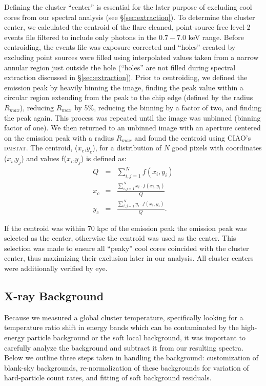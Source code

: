 \documentclass[12pt,preprint]{aastex}
\begin{document}
Defining the cluster ``center'' is essential for the later purpose of
excluding cool cores from our spectral analysis (see
\S\ref{sec:extraction}). To determine the cluster center, we
calculated the centroid of the flare cleaned, point-source
free level-2 events file filtered to include only photons in the
$0.7-7.0$ keV range. Before centroiding, the events file was
exposure-corrected and ``holes'' created by excluding point sources
were filled using interpolated values taken from a narrow annular region just
outside the hole (``holes'' are not filled during spectral extraction
discussed in \S\ref{sec:extraction}). Prior to centroiding, we defined
the emission peak by heavily binning the image, finding the peak value
within a circular region extending from the peak to the chip edge
(defined by the radius $R_{max}$), reducing $R_{max}$ by 5\%,
reducing the binning by a factor of two, and finding the peak
again. This process was repeated until the image was unbinned (binning
factor of one). We then returned to an unbinned image with an aperture
centered on the emission peak with a radius $R_{max}$ and found the
centroid using {\textsc{CIAO}}'s {\textsc{dmstat}}. The centroid, ($x_c$,$y_c$),
for a distribution of $N$ good pixels with coordinates ($x_i$,$y_j$)
and values f($x_i$,$y_j$) is defined as:
\begin{eqnarray}
Q &=& \sum_{i,j=1}^N f(x_i,y_i) \\
x_c &=& \frac{\sum_{i,j=1}^N x_i \cdot f(x_i,y_i)}{Q} \nonumber \\
y_c &=& \frac{\sum_{i,j=1}^N y_i \cdot f(x_i,y_i)}{Q}. \nonumber
\end{eqnarray}

If the centroid was within 70 kpc of the emission peak the emission
peak was selected as the center, otherwise the centroid was used
as the center. This selection was made to ensure all ``peaky'' cool
cores coincided with the cluster center, thus maximizing their
exclusion later in our analysis. All cluster centers were additionally
verified by eye.

\subsection{X-ray Background} \label{sec:background}

Because we measured a global cluster temperature, specifically looking
for a temperature ratio shift in energy bands which can be
contaminated by the high-energy particle background or the soft local
background, it was important to carefully analyze the background and
subtract it from our resulting spectra. Below we outline three steps
taken in handling the background: customization of blank-sky backgrounds,
re-normalization of these backgrounds for variation of hard-particle
count rates, and fitting of soft background residuals.
\end{document}
